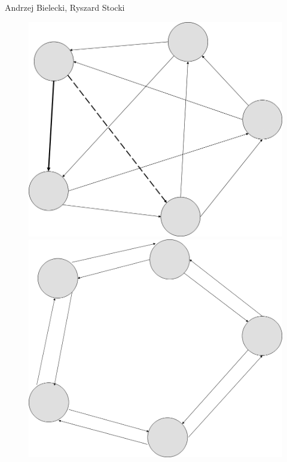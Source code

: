 \begin{artengenv2auth}{Andrzej Bielecki, Ryszard Stocki}
\begin{figure}[htbp]
 \centering %

 \begin{minipage}[b]{.45\textwidth}
   \centering
   \includegraphics[width=\textwidth]{ART_Bielecki/InfoStructcorrectedcopyeditedPP-img002.png}
 \end{minipage}%
 \hfill
 \begin{minipage}[b]{.45\textwidth}
   \centering
   \includegraphics[width=\textwidth]{ART_Bielecki/InfoStructcorrectedcopyeditedPP-img003.png}
 \end{minipage}


\end{figure}
\end{artengenv2auth}
